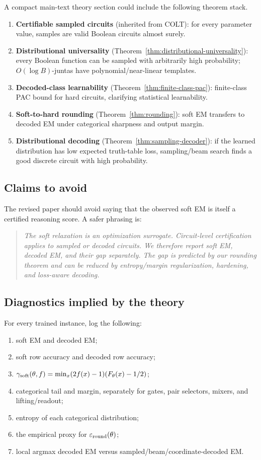 \documentclass[11pt]{article}
\theoremstyle{definition}
\theoremstyle{remark}
\newcommand{\errround}{\varepsilon_{\rm round}}
\newcommand{\gammsoft}{\gamma_{\rm soft}}
\begin{document}
A compact main-text theory section could include the following theorem stack.
\begin{enumerate}[leftmargin=1.4em]
\item \textbf{Certifiable sampled circuits} (inherited from COLT): for every parameter value, samples are valid Boolean circuits almost surely.
\item \textbf{Distributional universality} (Theorem~\ref{thm:distributional-universality}): every Boolean function can be sampled with arbitrarily high probability; $O(\log B)$-juntas have polynomial/near-linear templates.
\item \textbf{Decoded-class learnability} (Theorem~\ref{thm:finite-class-pac}): finite-class PAC bound for hard circuits, clarifying statistical learnability.
\item \textbf{Soft-to-hard rounding} (Theorem~\ref{thm:rounding}): soft EM transfers to decoded EM under categorical sharpness and output margin.
\item \textbf{Distributional decoding} (Theorem~\ref{thm:sampling-decoder}): if the learned distribution has low expected truth-table loss, sampling/beam search finds a good discrete circuit with high probability.
\end{enumerate}

\subsection{Claims to avoid}

The revised paper should avoid saying that the observed soft EM is itself a certified reasoning score.  A safer phrasing is:
\begin{quote}
\emph{The soft relaxation is an optimization surrogate.  Circuit-level certification applies to sampled or decoded circuits.  We therefore report soft EM, decoded EM, and their gap separately.  The gap is predicted by our rounding theorem and can be reduced by entropy/margin regularization, hardening, and loss-aware decoding.}
\end{quote}

\subsection{Diagnostics implied by the theory}

For every trained instance, log the following:
\begin{enumerate}[leftmargin=1.4em]
\item soft EM and decoded EM;
\item soft row accuracy and decoded row accuracy;
\item $\gammsoft(\theta,f)=\min_x(2f(x)-1)(F_\theta(x)-1/2)$;
\item categorical tail and margin, separately for gates, pair selectors, mixers, and lifting/readout;
\item entropy of each categorical distribution;
\item the empirical proxy for $\errround(\theta)$;
\item local argmax decoded EM versus sampled/beam/coordinate-decoded EM.
\end{enumerate}
\end{document}
